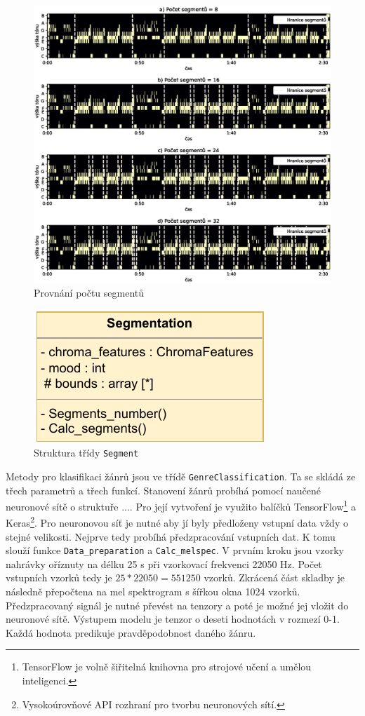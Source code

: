 \begin{figure}[H]
    \centering
    \includegraphics[width = 1\linewidth]{obrazky/Segmentation_segments_comparisons.eps}
    \caption{Provnání počtu segmentů}
    \label{fig:Segmentation_segments_comparison}
\end{figure}

\begin{figure}[H]
    \centering
    \includegraphics[width = 0.3\linewidth]{obrazky/UML_diagram_Segmentation.pdf}
    \caption{Struktura třídy \texttt{Segment}}
    \label{fig:Segmentation_diagram}
\end{figure}

Metody pro klasifikaci žánrů jsou ve třídě \texttt{GenreClassification}. Ta se skládá ze třech parametrů a třech funkcí. Stanovení žánrů probíhá pomocí naučené neuronové sítě o struktuře .... Pro její vytvoření je využito balíčků TensorFlow\footnote{TensorFlow je volně šiřitelná knihovna pro strojové učení a umělou inteligenci.} a Keras\footnote{Vysokoúrovňové API rozhraní pro tvorbu neuronových sítí.}. Pro neuronovou síť je nutné aby jí byly předloženy vstupní data vždy o stejné velikosti. Nejprve tedy probíhá předzpracování vstupních dat. K tomu slouží funkce \texttt{Data\_preparation} a \texttt{Calc\_melspec}. V prvním kroku jsou vzorky nahrávky oříznuty na délku 25 s při vzorkovací frekvenci 22050 Hz. Počet vstupních vzorků tedy je $25 * 22050 = 551250$ vzorků. Zkrácená část skladby je následně přepočtena na mel spektrogram s šířkou okna 1024 vzorků. Předzpracovaný signál je nutné převést na tenzory a poté je možné jej vložit do neuronové sítě. Výstupem modelu je tenzor o deseti hodnotách v rozmezí 0-1. Každá hodnota predikuje pravděpodobnost daného žánru. 

